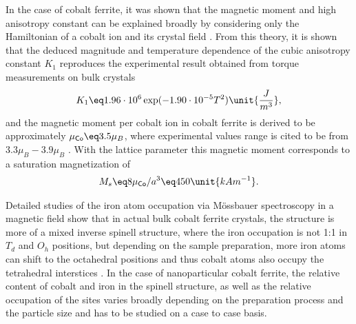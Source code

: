 \documentclass[\main/dresen_thesis.tex]{subfiles}
\begin{document}
  In the case of cobalt ferrite, it was shown that the magnetic moment and high anisotropy constant can be explained broadly by considering only the Hamiltonian of a cobalt ion and its crystal field \cite{Slonczewski_1958_Origi, Tachiki_1960_Origi}.
  From this theory, it is shown that the deduced magnitude and temperature dependence of the cubic anisotropy constant $K_1$ reproduces the experimental result obtained from torque measurements on bulk crystals \cite{Shenker_1957_Magne}
  \begin{align}
    K_1 \eq 1.96 \cdot 10^6 \exp(-1.90 \cdot 10^{-5} T^2) \unit{\frac{J}{m^3}},
  \end{align}
  and the magnetic moment per cobalt ion in cobalt ferrite is derived to be approximately $\mu_\textsf{Co} \eq 3.5 \mu_B$, where experimental values range is cited to be from $3.3 \mu_B - 3.9 \mu_B$ \cite{Tachiki_1960_Origi}.
  With the lattice parameter this magnetic moment corresponds to a saturation magnetization of
  \begin{align}
    M_s \eq 8\mu_\textsf{Co}/a^3 \eq 450 \unit{kAm^{-1}}.
  \end{align}

  Detailed studies of the iron atom occupation via M\"ossbauer spectroscopy in a magnetic field show that in actual bulk cobalt ferrite crystals, the structure is more of a mixed inverse spinell structure, where the iron occupation is not 1:1 in $T_d$ and $O_h$ positions, but depending on the sample preparation, more iron atoms can shift to the octahedral positions and thus cobalt atoms also occupy the tetrahedral interstices \cite{Sawatzky_1968_Catio, Sawatzky_1969_Mossb}.
  In the case of nanoparticular cobalt ferrite, the relative content of cobalt and iron in the spinell structure, as well as the relative occupation of the sites varies broadly depending on the preparation process and the particle size \cite{Muscas_2015_Evolu, Repko_2015_Oleate, Peddis_2008_Spinc} and has to be studied on a case to case basis.
\end{document}
